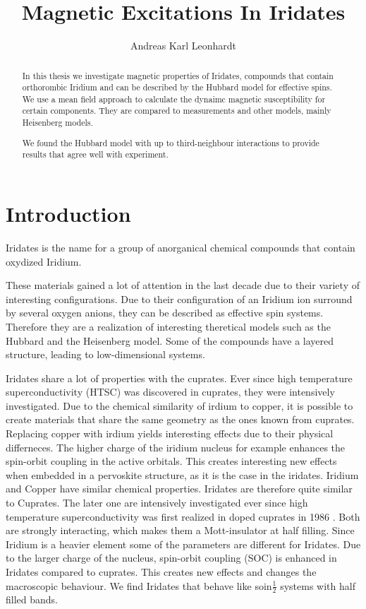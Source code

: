 \documentclass[a4paper,12pt]{report}
\title{Magnetic Excitations In Iridates}
\author{Andreas Karl Leonhardt}
\begin{document}

\begin{abstract}
In this thesis we investigate magnetic properties of Iridates, 
compounds that contain orthorombic Iridium and can be described by the Hubbard model for effective spins.
We use a mean field approach to calculate the dynaimc magnetic susceptibility for certain components.
They are compared to measurements and other models, mainly Heisenberg models. 

We found the Hubbard model with up to third-neighbour interactions to provide results that agree well with experiment.
\end{abstract}


\tableofcontents

\chapter{Introduction}

Iridates is the name for a group of anorganical chemical compounds that contain oxydized Iridium.

These materials gained a lot of attention in the last decade due to their variety of interesting configurations.
Due to their configuration of an Iridium ion surround by several oxygen anions, they can be described as effective spin systems.
Therefore they are a realization of interesting theretical models such as the Hubbard and the Heisenberg model.
Some of the compounds have a layered structure, leading to low-dimensional systems.


Iridates share a lot of properties with the cuprates. 
Ever since high temperature superconductivity (HTSC) was discovered in cuprates, 
they were intensively investigated. 
Due to the chemical similarity of irdium to copper, it is possible to create materials that share the same geometry as the ones known from cuprates.
Replacing copper with irdium yields interesting effects due to their physical differneces.
The higher charge of the iridium nucleus for example enhances the spin-orbit coupling in the active orbitals.
This creates interesting new effects when embedded in a pervoskite structure, as it is the case in the iridates.
%
%
Iridium and Copper have similar chemical properties. 
Iridates are therefore quite similar to Cuprates. 
The later one are intensively investigated ever since high temperature superconductivity was first realized in doped cuprates in 1986 \cite{}.
Both are strongly interacting, which makes them a Mott-insulator at half filling.
Since Iridium is a heavier element some of the parameters are different for Iridates. 
Due to the larger charge of the nucleus, spin-orbit coupling (SOC) is enhanced in Iridates compared to cuprates.
This creates new effects and changes the macroscopic behaviour. 
We find Iridates that behave like soin$\frac12$ systems with half filled bands. 
\end{document}
